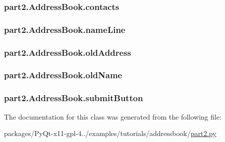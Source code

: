 \subsubsection[{contacts}]{\setlength{\rightskip}{0pt plus 5cm}part2.\+Address\+Book.\+contacts}\label{classpart2_1_1AddressBook_ab374d45ea613eb8902a8dd08a858f71d}
\hypertarget{classpart2_1_1AddressBook_ac30519a4b1ab88819807c73bcd055931}{}
\subsubsection[{name\+Line}]{\setlength{\rightskip}{0pt plus 5cm}part2.\+Address\+Book.\+name\+Line}\label{classpart2_1_1AddressBook_ac30519a4b1ab88819807c73bcd055931}
\hypertarget{classpart2_1_1AddressBook_a66ec7a1ee505e1878df07ac955a53d41}{}
\subsubsection[{old\+Address}]{\setlength{\rightskip}{0pt plus 5cm}part2.\+Address\+Book.\+old\+Address}\label{classpart2_1_1AddressBook_a66ec7a1ee505e1878df07ac955a53d41}
\hypertarget{classpart2_1_1AddressBook_a4f9e21c2347f2a76820a55868c231f70}{}
\subsubsection[{old\+Name}]{\setlength{\rightskip}{0pt plus 5cm}part2.\+Address\+Book.\+old\+Name}\label{classpart2_1_1AddressBook_a4f9e21c2347f2a76820a55868c231f70}
\hypertarget{classpart2_1_1AddressBook_ac14662670e7b2d2e8e2dcb2b0481ba36}{}
\subsubsection[{submit\+Button}]{\setlength{\rightskip}{0pt plus 5cm}part2.\+Address\+Book.\+submit\+Button}\label{classpart2_1_1AddressBook_ac14662670e7b2d2e8e2dcb2b0481ba36}


The documentation for this class was generated from the following file\+:\begin{DoxyCompactItemize}
\item 
packages/\+Py\+Qt-\/x11-\/gpl-\/4../examples/tutorials/addressbook/\hyperlink{part2_8py}{part2.\+py}\end{DoxyCompactItemize}
